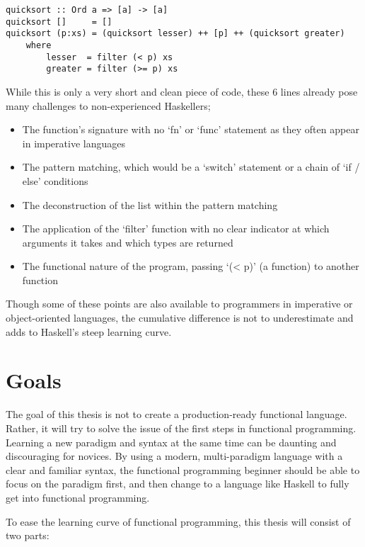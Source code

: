\begin{verbatim}
quicksort :: Ord a => [a] -> [a]
quicksort []     = []
quicksort (p:xs) = (quicksort lesser) ++ [p] ++ (quicksort greater)
    where
        lesser  = filter (< p) xs
        greater = filter (>= p) xs
\end{verbatim}

While this is only a very short and clean piece of code, these 6 lines already pose many challenges to non-experienced Haskellers;

\begin{itemize}
    \item The function's signature with no `fn' or `func' statement as they often appear in imperative languages
    \item The pattern matching, which would be a `switch' statement or a chain of `if / else' conditions
    \item The deconstruction of the list within the pattern matching
    \item The application of the `filter' function with no clear indicator at which arguments it takes and which types are returned
    \item The functional nature of the program, passing `(< p)' (a function) to another function
\end{itemize}

Though some of these points are also available to programmers in imperative or object-oriented languages, the cumulative difference
is not to underestimate and adds to Haskell's steep learning curve.


\section{Goals}

The goal of this thesis is not to create a production-ready functional language. Rather, it will
try to solve the issue of the first steps in functional programming.
Learning a new paradigm and syntax at the same time can be daunting and discouraging for novices.
By using a modern, multi-paradigm language with a clear
and familiar syntax, the functional programming beginner should be able to focus on the paradigm
first, and then change to a language like Haskell to fully get into functional programming.

To ease the learning curve of functional programming, this thesis will consist of two parts:

